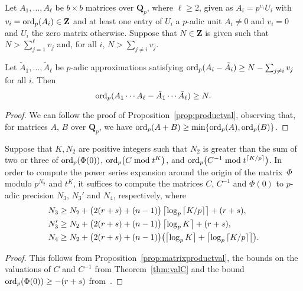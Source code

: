 \begin{prop} \label{prop:matrixproductval}
Let $A_1, \dotsc, A_{\ell}$ be $b \times b$ matrices over $\mathbf{Q}_p$, 
where $\ell \geq 2$, given as $A_i = p^{v_i} U_i$ with 
$v_i = \operatorname{ord}_p(A_i) \in \mathbf{Z}$ and at least one entry of $U_i$ a 
$p$-adic unit $A_i \neq 0$ and $v_i = 0$ and $U_i$ the zero matrix 
otherwise.  Suppose that $N \in \mathbf{Z}$ is given such that 
$N > \sum_{j=1}^{\ell} v_j$ and, for all $i$, $N > \sum_{j \neq i} v_j$.

Let $\tilde{A}_1, \dotsc, \tilde{A}_{\ell}$ be $p$-adic approximations 
satisfying $\operatorname{ord}_p(A_i - \tilde{A}_i) \geq N - \sum_{j \neq i} v_j$ 
for all $i$.  Then 
\begin{equation*}
\operatorname{ord}_p(A_1 \dotsm A_{\ell} - \tilde{A}_1 \dotsm \tilde{A}_{\ell}) \geq N.
\end{equation*}
\end{prop}

\begin{proof}
We can follow the proof of Proposition~\ref{prop:productval}, 
observing that, for matrices $A$, $B$ over $\mathbf{Q}_p$, 
we have $\operatorname{ord}_p(A + B) \geq \min \{\operatorname{ord}_p(A), \operatorname{ord}_p(B)\}$.
\end{proof}

\begin{cor}
Suppose that $K, N_2$ are positive integers such that $N_2$ is greater than 
the sum of two or three of $\operatorname{ord}_p(\Phi(0))$, $\operatorname{ord}_p\bigl(C \bmod t^K\bigr)$, 
and $\operatorname{ord}_p\bigl(C^{-1} \bmod{t^{\left\lceil K/p\right\rceil}}\bigr)$.
In order to compute the power series expansion around the origin 
of the matrix~$\Phi$ modulo $p^{N_2}$ and $t^K$, it suffices to 
compute the matrices $C$, $C^{-1}$ and $\Phi(0)$ to $p$-adic 
precision $N_3$, $N_3'$ and $N_4$, respectively, where 
\begin{align*}
N_3  & \geq N_2 + \bigl(2(r+s)+(n-1)\bigr) \left\lceil\log_p \left\lceil K/p\right\rceil\right\rceil + (r+s), \\
N_3' & \geq N_2 + \bigl(2(r+s)+(n-1)\bigr) \left\lceil\log_p K\right\rceil + (r+s), \\
N_4  & \geq N_2 + \bigl(2(r+s)+(n-1)\bigr) \bigl(\left\lceil\log_p K\right\rceil + \left\lceil\log_p \left\lceil K/p\right\rceil\right\rceil\bigr).
\end{align*}
\end{cor}

\begin{proof}
This follows from Proposition~\ref{prop:matrixproductval}, the bounds 
on the valuations of $C$ and $C^{-1}$ from Theorem~\ref{thm:valC} and 
the bound $\operatorname{ord}_p(\Phi(0)) \geq -(r+s)$ from~\citep[Lemma~3.3]{Gerkmann2007}.
\end{proof}

